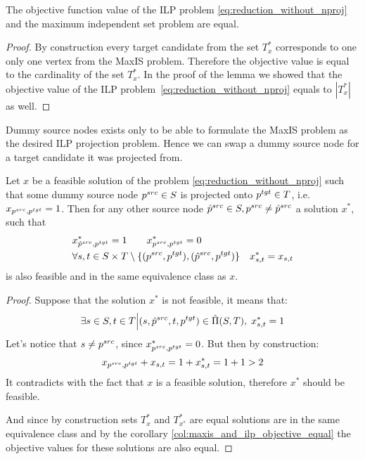 \begin{corollary} \label{col:maxis_and_ilp_objective_equal}
  The objective function value of the ILP problem \eqref{eq:reduction_without_nproj} and the maximum independent
  set problem are equal.
\end{corollary}
\begin{proof}
  By construction every target candidate from the set \( T^*_x \) corresponds to one only one vertex
  from the MaxIS problem. Therefore the objective value is equal to the cardinality of the set \(  T^*_x \).
  In the proof of the lemma we showed that the objective value of the ILP problem~\eqref{eq:reduction_without_nproj}
  equals to \( | T^*_x| \) as well.
\end{proof}

Dummy source nodes exists only to be able to formulate the MaxIS problem as the desired ILP projection problem.
Hence we can swap a dummy source node for a target candidate it was projected from.
\begin{lemma} \label{lemma:swap_source_reduction}
  Let \( x \) be a feasible solution of the problem \eqref{eq:reduction_without_nproj} such that
  some dummy source node \( p^{src} \in S \) is projected onto \( p^{tgt} \in T \),
  i.e. \( x_{p^{src}, p^{tgt}} = 1 \). Then for any other source node
  \( \hat{p}^{src} \in S, p^{src} \neq \hat{p}^{src} \) a solution \( x^{*} \), such that
  \begin{align*}
    & x^*_{\hat{p}^{src}, p^{tgt}} = 1  \qquad
    x^*_{p^{src}, p^{tgt}} = 0                                                                                            \\
    & \forall s, t \in S \times T \setminus \{ (p^{src}, p^{tgt}), (\hat{p}^{src}, p^{tgt}) \} \quad x^*_{s,t} = x_{s,t}
  \end{align*}
  is also feasible and in the same equivalence class as \( x \).
\end{lemma}
\begin{proof}
  Suppose that the solution \( x^* \) is not feasible, it means that:
  \[
    \exists s \in S, t \in T \Big| (s, \hat{p}^{src}, t, p^{tgt}) \in \hat{\Pi}(S, T), \; x^*_{s, t} = 1
  \]
  Let's notice that \( s \neq p^{src} \), since \( x^*_{p^{src}, p^{tgt}} = 0 \).
  But then by construction:
  \[
    x_{p^{src}, p^{tgt}} + x_{s, t} = 1 + x^*_{s, t} = 1 + 1 > 2
  \]
  It contradicts with the fact that \( x \) is a feasible solution, therefore \( x^* \) should be
  feasible.

  And since by construction sets \( T^*_x \) and \( T^*_{x^*} \) are equal solutions are in the same equivalence
  class and by the corollary \ref{col:maxis_and_ilp_objective_equal} the objective values for these solutions are also equal.
\end{proof}


